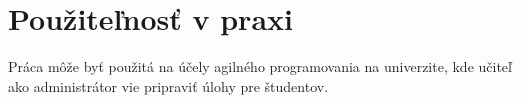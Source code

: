 \chapter{Použiteľnosť v praxi}

\label{kap:zakladne} %

Práca môže byť použitá na účely agilného programovania na univerzite, kde učiteľ ako
administrátor vie pripraviť úlohy pre študentov.  
